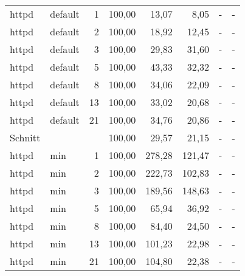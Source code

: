 \begin{footnotesize}
\begin{longtable}{llrrrrrr}
		httpd          & default & 1          & 100,00 & 13,07                       & 8,05                           & -      & -      \\
		httpd          & default & 2          & 100,00 & 18,92                       & 12,45                          & -      & -      \\
		httpd          & default & 3          & 100,00 & 29,83                       & 31,60                          & -      & -      \\
		httpd          & default & 5          & 100,00 & 43,33                       & 32,32                          & -      & -      \\
		httpd          & default & 8          & 100,00 & 34,06                       & 22,09                          & -      & -      \\
		httpd          & default & 13         & 100,00 & 33,02                       & 20,68                          & -      & -      \\
		httpd          & default & 21         & 100,00 & 34,76                       & 20,86                          & -      & -      \\ \hline
		Schnitt        &         &            & 100,00 & 29,57                       & 21,15                          & -      & -      \\ \hline
		httpd          & min     & 1          & 100,00 & 278,28                      & 121,47                         & -      & -      \\
		httpd          & min     & 2          & 100,00 & 222,73                      & 102,83                         & -      & -      \\
		httpd          & min     & 3          & 100,00 & 189,56                      & 148,63                         & -      & -      \\
		httpd          & min     & 5          & 100,00 & 65,94                       & 36,92                          & -      & -      \\
		httpd          & min     & 8          & 100,00 & 84,40                       & 24,50                          & -      & -      \\
		httpd          & min     & 13         & 100,00 & 101,23                      & 22,98                          & -      & -      \\
		httpd          & min     & 21         & 100,00 & 104,80                      & 22,38                          & -      & -      \\ \hline

\end{longtable}
\end{footnotesize}
